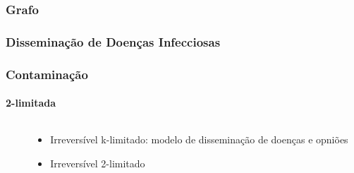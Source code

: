 \begin{frame}
\frametitle{Grafo}
\frametitle{Disseminação de Doenças Infecciosas}
\end{frame}

\begin{frame}
\frametitle{Contaminação}
\framesubtitle{2-limitada}
\begin{columns}[T]
    \begin{column}{.75\textwidth}
    \end{column}
    \begin{column}{.25\textwidth}
        \begin{itemize}
            \item{Irreversível k-limitado: modelo de disseminação de doenças e opniões}
            \item{Irreversível 2-limitado}
        \end{itemize}
    \end{column}
  \end{columns}
\end{frame}


